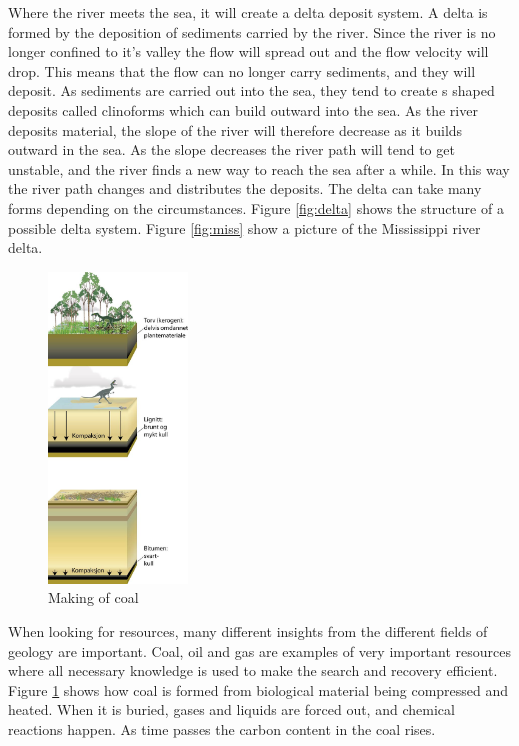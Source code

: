 \documentclass[a4paper,12pt]{report}
\begin{document}
Where the river meets the sea, it will create a delta deposit system. A delta is formed by the deposition of sediments carried by the river. Since the river is no longer confined to it's valley the flow will spread out and the flow velocity will drop. This means that the flow can no longer carry sediments, and they will deposit. As sediments are carried out into the sea, they tend to create s shaped deposits called clinoforms which can build outward into the sea. As the river deposits material, the slope of the river will therefore decrease as it builds outward in the sea. As the slope decreases the river path will tend to get unstable, and the river finds a new way to reach the sea after a while. In this way the river path changes and distributes the deposits. The delta can take many forms depending on the circumstances. Figure \ref{fig:delta} shows the structure of a possible delta system. Figure \ref{fig:miss} show a picture of the Mississippi river delta.





\begin{figure}
  \begin{center}
   \vspace{-15pt}
    \includegraphics[width=0.33\textwidth]{thesis/geo/coal.png}
  \end{center}
   \vspace{-15pt}
  \caption{Making of coal}
   \vspace{-15pt}
  \label{fig:coal}
\end{figure}
When looking for resources, many different insights from the different fields of geology are important. Coal, oil and gas are examples of very important resources where all necessary knowledge is used to make the search and recovery efficient. Figure \ref{fig:coal} shows how coal is formed from biological material being compressed and heated. When it is buried, gases and liquids are forced out, and chemical reactions happen. As time passes the carbon content in the coal rises.
\end{document}

